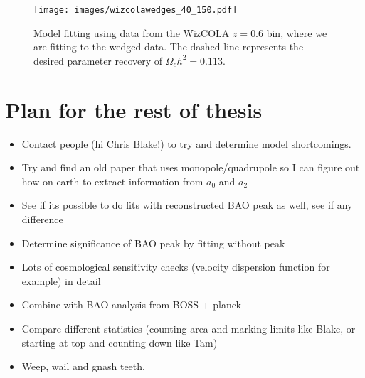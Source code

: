\documentclass[titlesmallcaps, examinerscopy, copyrightpage]{uqthesis}
\begin{document}
\begin{figure}[h!]
  \begin{center}
    \texttt{[image: images/wizcolawedges\_40\_150.pdf]}
  \end{center}
  \caption{Model fitting using data from the WizCOLA $z=0.6$ bin, where we are fitting to the wedged data. The dashed line represents the desired parameter recovery of $\Omega_c h^2 = 0.113$. }
  \label{fig:wizwedge}
\end{figure}



\chapter{Plan for the rest of thesis}
\begin{itemize}
\item Contact people (hi Chris Blake!) to try and determine model shortcomings.
\item Try and find an old paper that uses monopole/quadrupole so I can figure out how on earth to extract information from $a_0$ and $a_2$
\item See if its possible to do fits with reconstructed BAO peak as well, see if any difference
\item Determine significance of BAO peak by fitting without peak
\item Lots of cosmological sensitivity checks (velocity dispersion function for example) in detail
\item Combine with BAO analysis from BOSS + planck
\item Compare different statistics (counting area and marking limits like Blake, or starting at top and counting down like Tam)
\item Weep, wail and gnash teeth.
\end{itemize}




\end{document}
